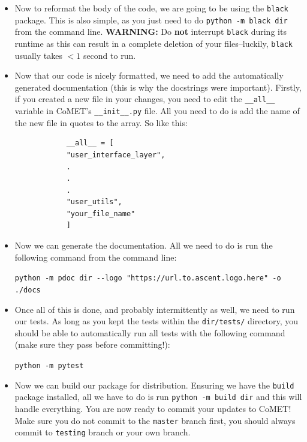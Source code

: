 \documentclass[10pt,a4paper]{article}
\begin{document}
\begin{itemize}
		\item Now to reformat the body of the code, we are going to be using the \verb|black| package. This is also simple, as you just need to do \verb|python -m black dir| from the command line.  \textbf{WARNING:} Do \textbf{not} interrupt \verb|black| during its runtime as this can result in a complete deletion of your files--luckily, \verb|black| usually takes $<1$ second to run.
		
		\item Now that our code is nicely formatted, we need to add the automatically generated documentation (this is why the docstrings were important). Firstly, if you created a new file in your changes, you need to edit the \verb|__all__| variable in \ac{CoMET}'s \verb|__init__.py| file. All you need to do is add the name of the new file in quotes to the array. So like this:
		
		\begin{verbatim}
			__all__ = [
			"user_interface_layer",
			.
			.
			.
			"user_utils",
			"your_file_name"
			]
		\end{verbatim}
		
		\item Now we can generate the documentation. All we need to do is run the following command from the command line: 
		
		\verb|python -m pdoc dir --logo "https://url.to.ascent.logo.here" -o ./docs|
		
		\item Once all of this is done, and probably intermittently as well, we need to run our tests. As long as you kept the tests within the \verb|dir/tests/| directory, you should be able to automatically run all tests with the following command (make sure they pass before committing!): 
		
		\verb|python -m pytest|
		
		\item Now we can build our package for distribution. Ensuring we have the \verb|build| package installed, all we have to do is run \verb|python -m build dir| and this will handle everything. You are now ready to commit your updates to \ac{CoMET}! Make sure you do not commit to the \verb|master| branch first, you should always commit to \verb|testing| branch or your own branch.
	\end{itemize}
	
\end{document}
